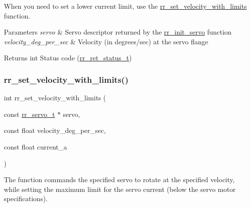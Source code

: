 When you need to set a lower current limit, use the \hyperlink{group___motion_ga252ba86c50217d9ccf08deaf4c75f2e7}{rr\+\_\+set\+\_\+velocity\+\_\+with\+\_\+limits} function.


\begin{DoxyParams}{Parameters}
{\em servo} & Servo descriptor returned by the \hyperlink{group___init_ga0adb313a3eeb8a4399431e940a1f3e9e}{rr\+\_\+init\+\_\+servo} function \\
\hline
{\em velocity\+\_\+deg\+\_\+per\+\_\+sec} & Velocity (in degrees/sec) at the servo flange \\
\hline
\end{DoxyParams}
\begin{DoxyReturn}{Returns}
int Status code (\hyperlink{api_8h_a92d5be5038abcf89837faf85a08debdc}{rr\+\_\+ret\+\_\+status\+\_\+t}) 
\end{DoxyReturn}
\mbox{\label{group___motion_ga252ba86c50217d9ccf08deaf4c75f2e7}} 
\subsubsection{\texorpdfstring{rr\+\_\+set\+\_\+velocity\+\_\+with\+\_\+limits()}{rr\_set\_velocity\_with\_limits()}}
{\footnotesize\ttfamily int rr\+\_\+set\+\_\+velocity\+\_\+with\+\_\+limits (\begin{DoxyParamCaption}\item[{const \hyperlink{structrr__servo__t}{rr\+\_\+servo\+\_\+t} $\ast$}]{servo,  }\item[{const float}]{velocity\+\_\+deg\+\_\+per\+\_\+sec,  }\item[{const float}]{current\+\_\+a }\end{DoxyParamCaption})}



The function commands the specified servo to rotate at the specified velocity, while setting the maximum limit for the servo current (below the servo motor specifications). 



